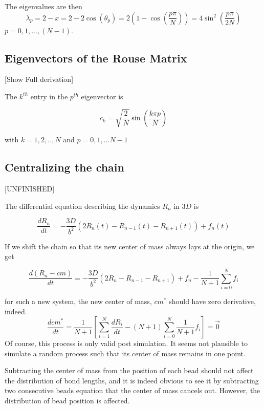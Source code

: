 \documentclass{report}
\begin{document}
The eigenvalues are then
\begin{equation*}
\lambda_p=2-x = 2-2\cos(\theta_p)=2\left(1-\cos(\frac{p\pi}{N})\right)=4\sin^2(\frac{p\pi}{2N})
\end{equation*}
$p=0,1,...,(N-1)$.

\subsection{Eigenvectors of the Rouse Matrix}\label{subsection_eigenvectorsOfTheRouseMatrix}
[Show Full derivation]

The $k^{th}$ entry in the $p^{th}$ eigenvector is 

\begin{equation*}
c_k = \sqrt{\frac{2}{N}}\sin(\frac{k\pi p}{N})
\end{equation*}

with $k=1,2,..,N$ and $p=0,1,...N-1$

\subsection{Centralizing the chain}\label{subsection_centralizingTheChain}
[UNFINISHED]

The differential equation describing the dynamics $R_n$ in $3D$ is

\begin{equation*}
\frac{dR_n}{dt} = -\frac{3D}{b^2}\left(2R_n(t)-R_{n-1}(t)-R_{n+1}(t) \right)+f_n(t)
\end{equation*}

If we shift the chain so that its new center of mass always lays at the origin, we get 

 \begin{equation*}
\frac{d(R_n-cm)}{dt} = -\frac{3D}{b^2}\left(2R_n-R_{n-1}-R_{n+1} \right)+f_n-\frac{1}{N+1}\sum_{i=0}^Nf_i
\end{equation*}

for such a new system, the new center of mass, $cm^*$ should have zero derivative, indeed. 
\begin{equation*}
\frac{dcm^*}{dt}=\frac{1}{N+1}\left[ \sum_{i=1}^N\frac{dR_i}{dt} - (N+1)\sum_{i=0}^N\frac{1}{N+1}f_i \right]= \vec{0}
\end{equation*}
Of course, this process is only valid post simulation. It seems not plausible to simulate a random process such that its center of mass remains in one point. 

Subtracting the center of mass from the position of each bead should not affect the distribution of bond lengths, and it is indeed obvious to see it by subtracting two consecutive beads equation that the center of mass cancels out. However, the distribution of bead position is affected. 
\end{document}
